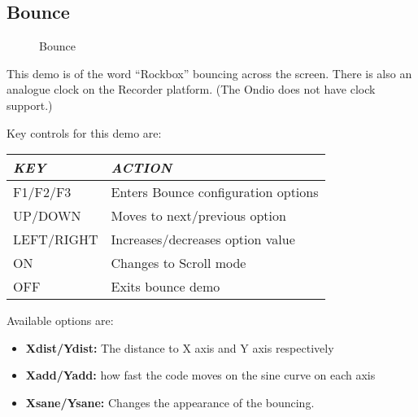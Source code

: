 \subsection{Bounce}
\begin{figure}[h]
\begin{center}
\end{center}
\caption{Bounce}
\end{figure}

This demo is of the word ``Rockbox'' bouncing across the screen.  There
is also an analogue clock on the Recorder platform.  (The Ondio does
not have clock support.)

Key controls for this demo are:

\begin{center}\begin{tabular}{|p{3.169cm}|p{8.069cm}|}
\hline
{\centering\bfseries\itshape
KEY
\par}
&
{\centering\bfseries\itshape
ACTION
\par}
\\\hline
{\centering
F1/F2/F3
\par}
&
Enters Bounce configuration options
\\\hline
{\centering
UP/DOWN
\par}
&
Moves to next/previous option
\\\hline
{\centering
LEFT/RIGHT
\par}
&
Increases/decreases option value
\\\hline
{\centering
ON
\par}
&
Changes to Scroll mode
\\\hline
{\centering
OFF
\par}
&
Exits bounce demo
\\\hline
\end{tabular}\end{center}
Available options are:

\begin{itemize}
\item \textbf{Xdist/Ydist:} The distance to X axis and Y axis
respectively
\item \textbf{Xadd/Yadd:} how fast the code moves on the sine curve on
each axis
\item \textbf{Xsane/Ysane:} Changes the appearance of the bouncing.
\end{itemize}


